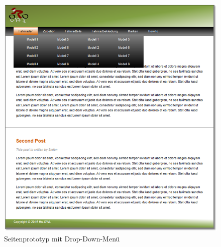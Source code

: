 \begin{figure}[H]
\begin{center}
\includegraphics[width=150mm]{Bilder/Abbildung4-SeitenprototypMitDropDownMenue.png}
\end{center}
\caption{Seitenprototyp mit Drop-Down-Menü}
\end{figure}




